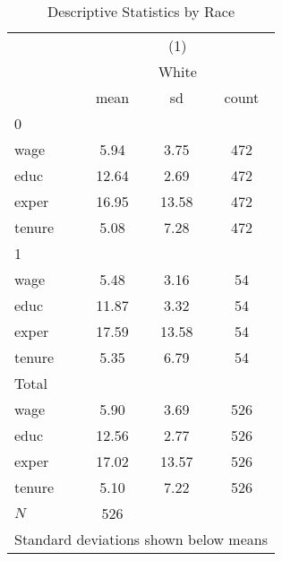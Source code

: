 \begin{table}[htbp]\centering
\def\sym#1{\ifmmode^{#1}\else\(^{#1}\)\fi}
\caption{Descriptive Statistics by Race}
\begin{tabular}{l*{1}{ccc}}
\toprule
            &\multicolumn{3}{c}{(1)}               \\
            &\multicolumn{3}{c}{White}             \\
            &        mean&          sd&       count\\
\midrule
0           &            &            &            \\
wage        &        5.94&        3.75&         472\\
educ        &       12.64&        2.69&         472\\
exper       &       16.95&       13.58&         472\\
tenure      &        5.08&        7.28&         472\\
\midrule
1           &            &            &            \\
wage        &        5.48&        3.16&          54\\
educ        &       11.87&        3.32&          54\\
exper       &       17.59&       13.58&          54\\
tenure      &        5.35&        6.79&          54\\
\midrule
Total       &            &            &            \\
wage        &        5.90&        3.69&         526\\
educ        &       12.56&        2.77&         526\\
exper       &       17.02&       13.57&         526\\
tenure      &        5.10&        7.22&         526\\
\midrule
\(N\)       &         526&            &            \\
\bottomrule
\multicolumn{4}{l}{\footnotesize Standard deviations shown below means}\\
\end{tabular}
\end{table}
